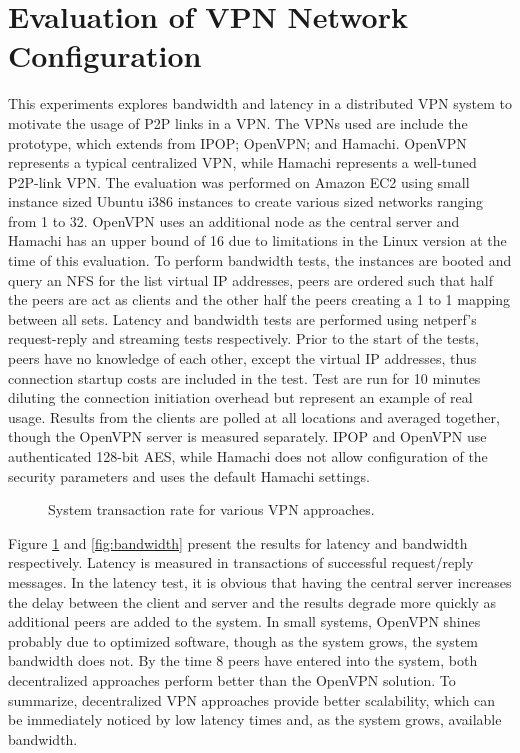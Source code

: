 \section{Evaluation of VPN Network Configuration}

This experiments explores bandwidth and latency in a distributed VPN system to
motivate the usage of P2P links in a VPN.  The VPNs used are include the
prototype, which extends from IPOP; OpenVPN; and Hamachi.  OpenVPN represents a
typical centralized VPN, while Hamachi represents a well-tuned P2P-link VPN.
The evaluation was performed on Amazon EC2 using small instance sized Ubuntu
i386 instances to create various sized networks ranging from 1 to 32.  OpenVPN
uses an additional node as the central server and Hamachi has an upper bound of
16 due to limitations in the Linux version at the time of this evaluation.  To
perform bandwidth tests, the instances are booted and query an NFS for the list
virtual IP addresses, peers are ordered such that half the peers are act as
clients and the other half the peers creating a 1 to 1 mapping between all
sets.  Latency and bandwidth tests are performed using netperf's request-reply
and streaming tests respectively.  Prior to the start of the tests, peers have
no knowledge of each other, except the virtual IP addresses, thus connection
startup costs are included in the test.  Test are run for 10 minutes diluting
the connection initiation overhead but represent an example of real usage.
Results from the clients are polled at all locations and averaged together,
though the OpenVPN server is measured separately.  IPOP and OpenVPN use
authenticated 128-bit AES, while Hamachi does not allow configuration of the
security parameters and uses the default Hamachi settings.

\begin{figure}
\centering
{}
\caption{System transaction rate for various VPN approaches.}
\label{fig:latency}
\end{figure}

Figure \ref{fig:latency} and \ref{fig:bandwidth} present the results for latency
and bandwidth respectively.  Latency is measured in transactions of successful
request/reply messages.  In the latency test, it is obvious that having the
central server increases the delay between the client and server and the results
degrade more quickly as additional peers are added to the system.  In small
systems, OpenVPN shines probably due to optimized software, though as the system
grows, the system bandwidth does not.  By the time 8 peers have entered into
the system, both decentralized approaches perform better than the OpenVPN
solution.  To summarize, decentralized VPN approaches provide better
scalability, which can be immediately noticed by low latency times and, as the
system grows, available bandwidth.

